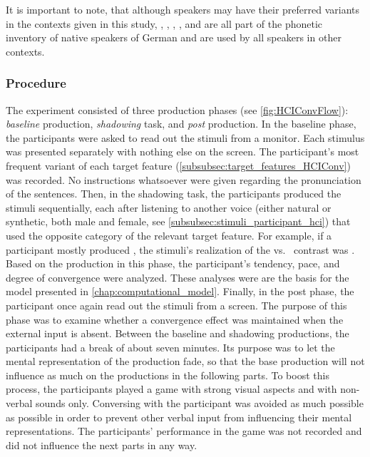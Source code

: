 It is important to note, that although speakers may have their preferred variants in the contexts given in this study, \textipa{[E:]}, \textipa{[e:]}, \textipa{[Ik]}, \textipa{[\s n]}, and \textipa{[@n]} are all part of the phonetic inventory of native speakers of German and are used by all speakers in other contexts. 

\subsubsection{Procedure}
\label{subsubsec:procedure_hci}

The experiment consisted of three production phases (see \cref{fig:HCIConvFlow}): \emph{baseline} production, \emph{shadowing} task, and \emph{post} production.
In the baseline phase, the participants were asked to read out the stimuli from a monitor.
Each stimulus was presented separately with nothing else on the screen.
The participant's most frequent variant of each target feature (\cref{subsubsec:target_features_HCIConv}) was recorded.
No instructions whatsoever were given regarding the pronunciation of the sentences.
Then, in the shadowing task, the participants produced the stimuli sequentially, each after listening to another voice (either natural or synthetic, both male and female, see \cref{subsubsec:stimuli_participant_hci}) that used the opposite category of the relevant target feature.
For example, if a participant mostly produced \textipa{[\c{c}]}, the stimuli's realization of the \textipa{[\c{c}]} vs.\ \textipa{[k]} contrast was \textipa{[k]}.
Based on the production in this phase, the participant's tendency, pace, and degree of convergence were analyzed.
These analyses were are the basis for the model presented in \cref{chap:computational_model}.
Finally, in the post phase, the participant once again read out the stimuli from a screen.
The purpose of this phase was to examine whether a convergence effect was maintained when the external input is absent.
Between the baseline and shadowing productions, the participants had a break of about seven minutes.
Its purpose was to let the mental representation of the production fade, so that the base production will not influence as much on the productions in the following parts.
To boost this process, the participants played a game with strong visual aspects and with non-verbal sounds only.
Conversing with the participant was avoided as much possible as possible in order to prevent other verbal input from influencing their mental representations.
The participants' performance in the game was not recorded and did not influence the next parts in any way.
